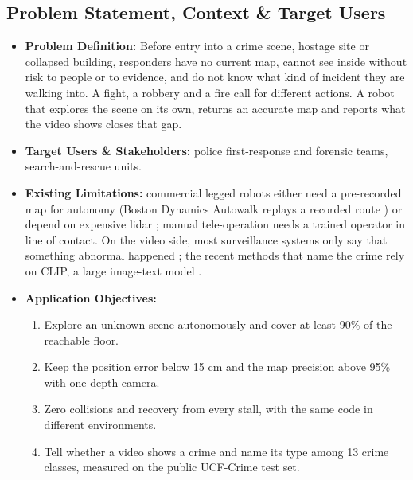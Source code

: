 \documentclass[11pt, a4paper]{article}
\begin{document}
\subsection{Problem Statement, Context \& Target Users}
\begin{itemize}[noitemsep, topsep=2pt]
    \item \textbf{Problem Definition:} Before entry into a crime scene, hostage site or collapsed building, responders have no current map, cannot see inside without risk to people or to evidence, and do not know what kind of incident they are walking into. A fight, a robbery and a fire call for different actions. A robot that explores the scene on its own, returns an accurate map and reports what the video shows closes that gap.
    \item \textbf{Target Users \& Stakeholders:} police first-response and forensic teams, search-and-rescue units.
    \item \textbf{Existing Limitations:} commercial legged robots either need a pre-recorded map for autonomy (Boston Dynamics Autowalk replays a recorded route \cite{spot}) or depend on expensive lidar \cite{corlito2026}; manual tele-operation needs a trained operator in line of contact. On the video side, most surveillance systems only say that something abnormal happened \cite{sultani2018}; the recent methods that name the crime rely on CLIP, a large image-text model \cite{wu2024ovvad,li2025anomize}.
    \item \textbf{Application Objectives:}
    \begin{enumerate}[noitemsep, topsep=2pt]
        \item Explore an unknown scene autonomously and cover at least 90\% of the reachable floor.
        \item Keep the position error below 15 cm and the map precision above 95\% with one depth camera.
        \item Zero collisions and recovery from every stall, with the same code in different environments.
        \item Tell whether a video shows a crime and name its type among 13 crime classes, measured on the public UCF-Crime test set.
    \end{enumerate}
\end{itemize}
\end{document}
